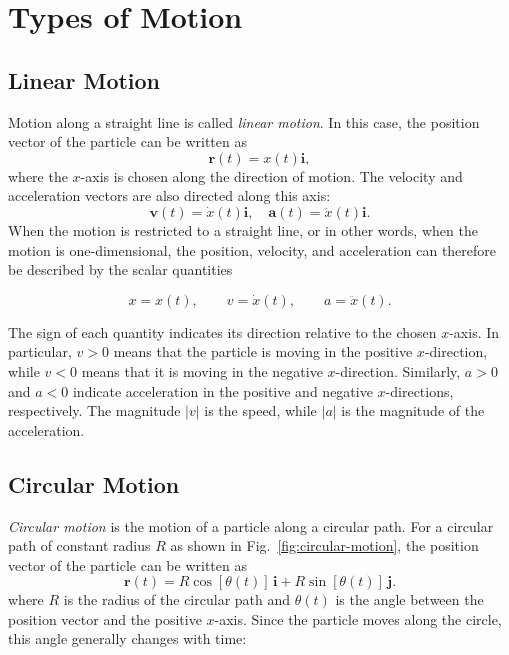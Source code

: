 \documentclass[../main.tex]{subfiles}
\theoremstyle{remark}
\begin{document}
\section{Types of Motion}

\subsection{Linear Motion}
Motion along a straight line is called \emph{linear motion}. In this case, the position vector of the particle can be written as
\begin{equation}
\mathbf{r}(t) = x(t)\mathbf{i},
\end{equation}
where the $x$-axis is chosen along the direction of motion. The velocity and acceleration vectors are also directed along this axis:
\begin{equation}
\mathbf{v}(t) = \dot{x}(t)\mathbf{i}, \quad \mathbf{a}(t) = \ddot{x}(t)\mathbf{i}.
\end{equation}
When the motion is restricted to a straight line, or in other words, when the motion is one-dimensional, the position, velocity, and acceleration can therefore be described by the scalar quantities

$$
x=x(t), \qquad v=\dot{x}(t), \qquad a=\ddot{x}(t).
$$

The sign of each quantity indicates its direction relative to the chosen \(x\)-axis. In particular, \(v>0\) means that the particle is moving in the positive \(x\)-direction, while \(v<0\) means that it is moving in the negative \(x\)-direction. Similarly, \(a>0\) and \(a<0\) indicate acceleration in the positive and negative \(x\)-directions, respectively. The magnitude \(|v|\) is the speed, while \(|a|\) is the magnitude of the acceleration.


\subsection{Circular Motion}
\label{sec:circular-motion}
\emph{Circular motion} is the motion of a particle along a circular path. For a circular path of constant radius $R$ as shown in Fig.~\ref{fig:circular-motion}, the position vector of the particle can be written as
\begin{equation}
\mathbf{r}(t)
=
R\cos[\theta(t)]\,\mathbf{i}
+
R\sin[\theta(t)]\,\mathbf{j}.
\end{equation}
where $R$ is the radius of the circular path and $\theta(t)$ is the angle between the position vector and the positive $x$-axis. Since the particle moves along the circle, this angle generally changes with time:
\end{document}
